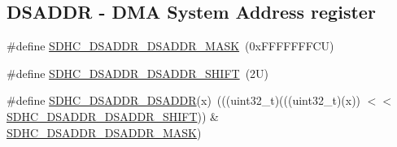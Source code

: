 \subsection*{D\+S\+A\+D\+DR -\/ D\+MA System Address register}
\begin{DoxyCompactItemize}
\item 
\#define \mbox{\hyperlink{group___s_d_h_c___register___masks_ga0879039aa6d312f63642daf292ea07e1}{S\+D\+H\+C\+\_\+\+D\+S\+A\+D\+D\+R\+\_\+\+D\+S\+A\+D\+D\+R\+\_\+\+M\+A\+SK}}~(0x\+F\+F\+F\+F\+F\+F\+F\+C\+U)
\item 
\#define \mbox{\hyperlink{group___s_d_h_c___register___masks_gaab7280ffe17d17dc4e36a58270c97edb}{S\+D\+H\+C\+\_\+\+D\+S\+A\+D\+D\+R\+\_\+\+D\+S\+A\+D\+D\+R\+\_\+\+S\+H\+I\+FT}}~(2\+U)
\item 
\#define \mbox{\hyperlink{group___s_d_h_c___register___masks_gaef12dcdcf7b6872221585294357d8bc4}{S\+D\+H\+C\+\_\+\+D\+S\+A\+D\+D\+R\+\_\+\+D\+S\+A\+D\+DR}}(x)~(((uint32\+\_\+t)(((uint32\+\_\+t)(x)) $<$$<$ \mbox{\hyperlink{group___s_d_h_c___register___masks_gaab7280ffe17d17dc4e36a58270c97edb}{S\+D\+H\+C\+\_\+\+D\+S\+A\+D\+D\+R\+\_\+\+D\+S\+A\+D\+D\+R\+\_\+\+S\+H\+I\+FT}})) \& \mbox{\hyperlink{group___s_d_h_c___register___masks_ga0879039aa6d312f63642daf292ea07e1}{S\+D\+H\+C\+\_\+\+D\+S\+A\+D\+D\+R\+\_\+\+D\+S\+A\+D\+D\+R\+\_\+\+M\+A\+SK}})
\end{DoxyCompactItemize}
